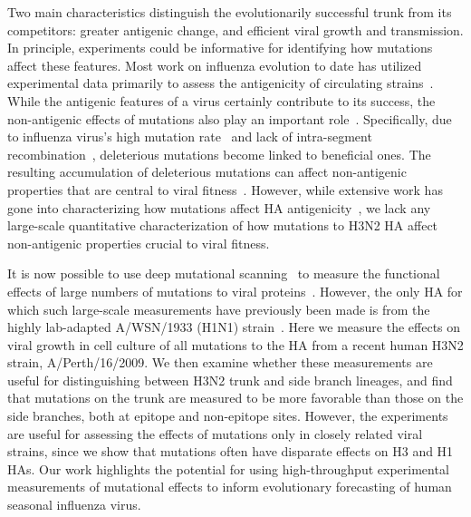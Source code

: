 \documentclass[9pt,twocolumn,twoside]{pnas-new}
\begin{document}
Two main characteristics distinguish the evolutionarily successful trunk from its competitors: greater antigenic change, and efficient viral growth and transmission.
In principle, experiments could be informative for identifying how mutations affect these features.
Most work on influenza evolution to date has utilized experimental data primarily to assess the antigenicity of circulating strains~\cite{sun2013using,harvey2016identification,neher2016prediction}.
While the antigenic features of a virus certainly contribute to its success, the non-antigenic effects of mutations also play an important role~\cite{pybus2007phylogenetic,strelkowa2012clonal,luksza2014predictive,koelle2015effects}.
Specifically, due to influenza virus's high mutation rate~\cite{holland1982rapid,steinhauer1987rapid,lauring2010quasispecies} and lack of intra-segment recombination~\cite{boni2008homologous}, deleterious mutations become linked to beneficial ones.
The resulting accumulation of deleterious mutations can affect non-antigenic properties that are central to viral fitness~\cite{luksza2014predictive}.
However, while extensive work has gone into characterizing how mutations affect HA antigenicity~\cite{laver1979antigenic, webster1980determination,wiley1981structural,koel2013substitutions,chambers2015identification,li2016selection}, we lack any large-scale quantitative characterization of how mutations to H3N2 HA affect non-antigenic properties crucial to viral fitness.

It is now possible to use deep mutational scanning~\cite{fowler2014deep} to measure the functional effects of large numbers of mutations to viral proteins~\cite{thyagarajan2014inherent,wu2014high,doud2016accurate,haddox2016experimental,qi2015high}.
However, the only HA for which such large-scale measurements have previously been made is from the highly lab-adapted A/WSN/1933 (H1N1) strain~\cite{thyagarajan2014inherent,wu2014high,doud2016accurate}.
Here we measure the effects on viral growth in cell culture of all mutations to the HA from a recent human H3N2 strain, A/Perth/16/2009.
We then examine whether these measurements are useful for distinguishing between H3N2 trunk and side branch lineages, and find that mutations on the trunk are measured to be more favorable than those on the side branches, both at epitope and non-epitope sites.
However, the experiments are useful for assessing the effects of mutations only in closely related viral strains, since we show that mutations often have disparate effects on H3 and H1 HAs.
Our work highlights the potential for using high-throughput experimental measurements of mutational effects to inform evolutionary forecasting of human seasonal influenza virus.
\end{document}
